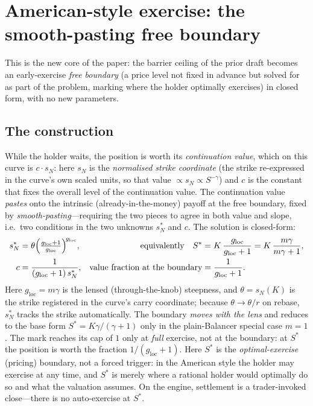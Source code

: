 \documentclass[11pt]{article}
\begin{document}
\section{American-style exercise: the smooth-pasting free boundary}
\label{sec:american}

This is the new core of the paper: the barrier ceiling of the prior draft becomes
an early-exercise \emph{free boundary} (a price level not fixed in advance but
solved for as part of the problem, marking where the holder optimally exercises)
in closed form, with no new parameters.

\subsection{The construction}
While the holder waits, the position is worth its \emph{continuation value}, which
on this curve is $c\cdot s_{N}$: here $s_{N}$ is the \emph{normalised strike
coordinate} (the strike re-expressed in the curve's own scaled units, so that value
$\propto s_{N}\propto S^{-\gamma}$) and $c$ is the constant that fixes the overall
level of the continuation value. The continuation value \emph{pastes} onto the
intrinsic (already-in-the-money) payoff at the free boundary, fixed by
\emph{smooth-pasting}---requiring the two pieces to agree in both value and slope,
i.e.\ two conditions in the two unknowns $s_{N}^{\ast}$ and $c$. The solution is
closed-form:
\begin{align}
  s_{N}^{\ast} &= \theta\Bigl(\tfrac{g_{\mathrm{loc}}+1}{g_{\mathrm{loc}}}\Bigr)^{\!g_{\mathrm{loc}}},
  & \text{equivalently}\quad
  S^{\ast} &= K\,\frac{g_{\mathrm{loc}}}{g_{\mathrm{loc}}+1}=K\,\frac{m\gamma}{m\gamma+1},
  \label{eq:boundary}\\
  c &= \frac{1}{(g_{\mathrm{loc}}+1)\,s_{N}^{\ast}},
  & \text{value fraction at the boundary} &= \frac{1}{g_{\mathrm{loc}}+1}.
  \label{eq:coeff}
\end{align}
Here $g_{\mathrm{loc}}=m\gamma$ is the lensed (through-the-knob) steepness, and
$\theta=s_{N}(K)$ is the strike registered in the curve's carry coordinate;
because $\theta\to\theta/r$ on rebase, $s_{N}^{\ast}$ tracks the strike
automatically. The boundary \emph{moves with the lens} and reduces to the base form
$S^{\ast}=K\gamma/(\gamma+1)$ only in the plain-Balancer special case $m=1$. The
mark reaches its cap of $1$ only at \emph{full} exercise, not at the boundary: at
$S^{\ast}$ the position is worth the fraction $1/(g_{\mathrm{loc}}+1)$. Here
$S^{\ast}$ is the \emph{optimal-exercise} (pricing) boundary, not a forced trigger:
in the American style the holder may exercise at any time, and $S^{\ast}$ is merely
where a rational holder would optimally do so and what the valuation assumes. On the
engine, settlement is a trader-invoked close---there is no auto-exercise at
$S^{\ast}$.
\end{document}

